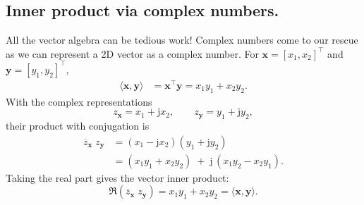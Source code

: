 \documentclass{ee102_notes}
\begin{document}
\subsection{Inner product via complex numbers.}
All the vector algebra can be tedious work! Complex numbers come to our rescue as we can represent a 2D vector as a complex number. For $\mathbf{x}=[x_1,x_2]^{\top}$ and $\mathbf{y}=[y_1,y_2]^{\top}$,
\begin{align*}
\langle \mathbf{x},\mathbf{y}\rangle
&= \mathbf{x}^{\top}\mathbf{y}
= x_1y_1+x_2y_2 .
\end{align*}
With the complex representations
\[
z_{\mathbf{x}}=x_1+\mathrm{j}x_2,\qquad
z_{\mathbf{y}}=y_1+\mathrm{j}y_2,
\]
their product with conjugation is
\begin{align*}
\overline{z}_{\mathbf{x}}\;z_{\mathbf{y}}
&=(x_1-\mathrm{j}x_2)(y_1+\mathrm{j}y_2) \\
&=(x_1y_1+x_2y_2)\;+\;\mathrm{j}\,(x_1y_2 - x_2y_1).
\end{align*}
Taking the real part gives the vector inner product:
\[
\Re\!\left(\overline{z}_{\mathbf{x}}\;z_{\mathbf{y}}\right)=x_1y_1+x_2y_2
=\langle \mathbf{x},\mathbf{y}\rangle .
\]
\end{document}
